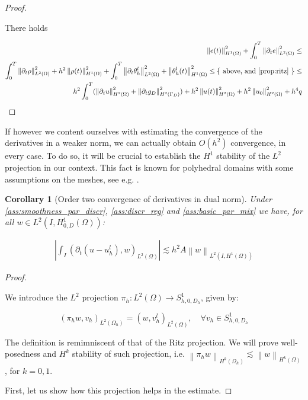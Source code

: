 \documentclass[english,a4paper,9pt,oneside]{scrbook}	%
\theoremstyle{break}
\newtheorem{cor}[equation]{Corollary}
\newenvironment{mproof}[1][\proofname]{%
  \begin{proof}[#1]$ $\par\nobreak\ignorespaces
}{%
  \end{proof}
}
\renewcommand*{\proofname}{Proof}
\theoremstyle{remark}
\newcommand{\norm}[1]{\left\lVert#1\right\rVert}
\newcommand{\ind}[1]{\{\text{ #1 }\}}
\begin{document}
\begin{appendices}
\begin{mproof}
There holds 

\begin{align*}
\norm{e(t)}_{H^1(\Omega)}^2 + \int_0^T\norm{\partial_t e}^2_{L^2(\Omega)}  \leq \\
\int_0^T\norm{\partial_t \rho}^2_{L^2(\Omega)} + h^2\norm{\rho(t)}_{H^1(\Omega)}^2 + \int_0^T\norm{\partial_t  \theta_h^l}^2_{L^2(\Omega)} + \norm{ \theta_h^l(t)}_{H^1(\Omega)}^2\leq \ind{above, and \cref{prop:ritz}}\leq \\
h^2\int_0^T(\norm{\partial_t u }_{H^2(\Omega)}^2 + \norm{\partial_t g_D }_{H^2(\Gamma_D)}^2) + h^2\norm{u(t)}_{H^2(\Omega)}^2 +  h^2\norm{u_0}_{H^2(\Omega)}^2+ h^4q
\end{align*}

\end{mproof}

If however we content ourselves with estimating the convergence of the derivatives in a weaker norm, we can actually obtain $O(h^2)$ convergence, in every case. To do so, it will be crucial to establish the $H^1$ stability of the $L^2$ projection in our context. This fact is known for polyhedral domains with some assumptions on the meshes, see e.g. \cite{yserentant}.

\begin{cor}[Order two convergence of derivatives in dual norm]
\label{cor:deriv_est_semid}
Under \cref{ass:smoothness_par_discr}, \cref{ass:discr_reg} and \cref{ass:basic_par_mix} we have, for all $w \in L^2(I,H^1_{0,D}(\Omega))$:

\begin{align*}
\left | \int_I (\partial_t(u-u_h^l), w)_{L^2(\Omega)}\right |\lesssim h^2 A \norm{w}_{L^2(I,H^1(\Omega))}
\end{align*}

\end{cor}

\begin{mproof}

We introduce the $L^2$ projection $\pi_h: L^2(\Omega) \rightarrow S^1_{h,0,D_h}$, given by:

$$(\pi_h w, v_h)_{L^2(\Omega_h)}=(w, v_h^l)_{L^2(\Omega)},\quad \forall  v_h \in S^1_{h,0,D_h}$$

The definition is remimniscent of that of the Ritz projection. We will prove well-posedness and $H^k$ stability of such projection, i.e. $\norm{\pi_h w}_{H^k(\Omega_h)}\lesssim\norm{w}_{H^k(\Omega)}$, for $k=0,1$.

First, let us show how this projection helps in the estimate.


\end{mproof}
\end{appendices}
\end{document}
